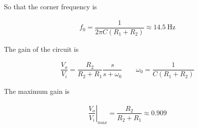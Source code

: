 \documentclass{article}
\begin{document}
So that the corner frequency is

\begin{equation*}
  \begin{aligned}
    f_0 = \dfrac{1}{2 \pi C \left( R_1 + R_2 \right)} \approx 14.5 \  \mathrm{Hz}
  \end{aligned}
\end{equation*}

The gain of the circuit is

\begin{equation*}
  \begin{aligned}
    \dfrac{V_o}{V_i} = \dfrac{R_2}{R_2 + R_1} \dfrac{s}{s + \omega_0} \quad\quad \omega_0 = \dfrac{1}{C \left( R_1 + R_2 \right)}   
  \end{aligned}
\end{equation*}

The maximum gain is

\begin{equation*}
  \begin{aligned}
    \left. \dfrac{V_o}{V_i}  \right|_{max} = \dfrac{R_2}{R_2 + R_1} \approx 0.909
  \end{aligned}
\end{equation*}
\end{document}
